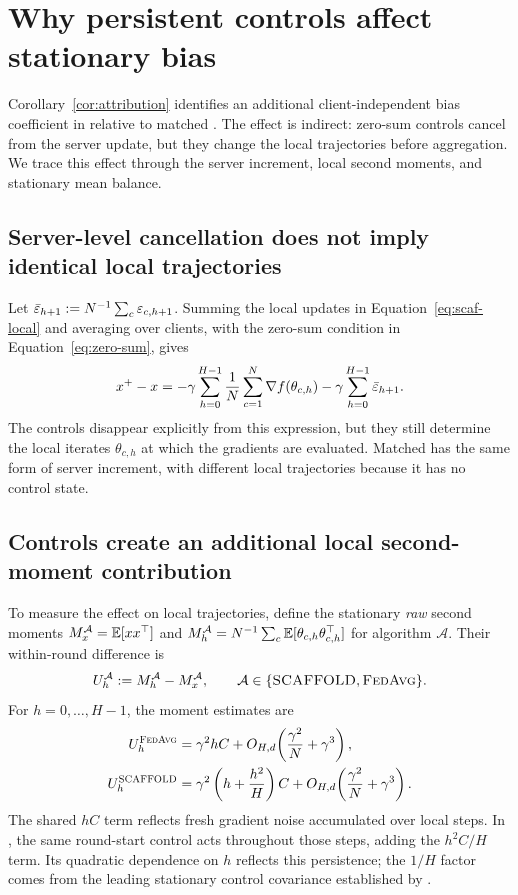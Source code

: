 \section{Why persistent controls affect stationary bias}
\label{sec:mechanism}

Corollary~\ref{cor:attribution} identifies an additional client-independent bias coefficient in \Scaf{} relative to matched \FedAvg{}. The effect is indirect: zero-sum controls cancel from the server update, but they change the local trajectories before aggregation. We trace this effect through the server increment, local second moments, and stationary mean balance.

\subsection{Server-level cancellation does not imply identical local trajectories}

Let $\bar{\varepsilon}_{h+1}:=N^{-1}\sum_c\varepsilon_{c,h+1}$. Summing the local updates in Equation~\eqref{eq:scaf-local} and averaging over clients, with the zero-sum condition in Equation~\eqref{eq:zero-sum}, gives
\begin{equation}
\label{eq:mechanism-global-increment}
x^+-x
=-\gamma\sum_{h=0}^{H-1}\frac1N\sum_{c=1}^N\nabla f(\theta_{c,h})
-\gamma\sum_{h=0}^{H-1}\bar{\varepsilon}_{h+1}.
\end{equation}
The controls disappear explicitly from this expression, but they still determine the local iterates $\theta_{c,h}$ at which the gradients are evaluated. Matched \FedAvg{} has the same form of server increment, with different local trajectories because it has no control state.

\subsection{Controls create an additional local second-moment contribution}

To measure the effect on local trajectories, define the stationary \emph{raw} second moments $M_x^{\mathcal A}=\mathbb{E}[xx^\top]$ and
$M_h^{\mathcal A}=N^{-1}\sum_c\mathbb{E}[\theta_{c,h}\theta_{c,h}^\top]$ for algorithm $\mathcal A$. Their within-round difference is
\begin{equation}
\label{eq:mechanism-moments}
U_h^{\mathcal A}:=M_h^{\mathcal A}-M_x^{\mathcal A},
\qquad \mathcal A\in\{\textnormal{\textsc{SCAFFOLD}},\textnormal{\textsc{FedAvg}}\}.
\end{equation}
For $h=0,\ldots,H-1$, the moment estimates are
\begin{align}
\label{eq:mechanism-U-fa}
U_h^{\textnormal{\textsc{FedAvg}}}
&=\gamma^2hC+O_{H,d}\!\left(\frac{\gamma^2}{N}+\gamma^3\right),\\
\label{eq:mechanism-U-scaf}
U_h^{\textnormal{\textsc{SCAFFOLD}}}
&=\gamma^2\left(h+\frac{h^2}{H}\right)C
  +O_{H,d}\!\left(\frac{\gamma^2}{N}+\gamma^3\right).
\end{align}
The shared $hC$ term reflects fresh gradient noise accumulated over local steps. In \Scaf{}, the same round-start control acts throughout those steps, adding the $h^2C/H$ term. Its quadratic dependence on $h$ reflects this persistence; the $1/H$ factor comes from the leading stationary control covariance established by \citet[Lemma~5.1]{mangold2025scaffold}.

